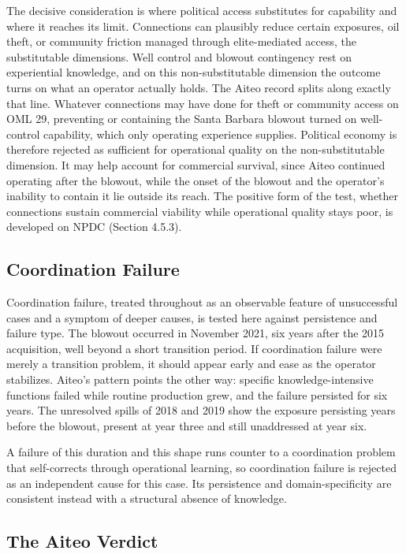 \documentclass[twoside,fontset=lmodern]{mitthesis}
\begin{document}
The decisive consideration is where political access substitutes for
capability and where it reaches its limit. Connections can plausibly
reduce certain exposures, oil theft, or community friction managed
through elite-mediated access, the substitutable dimensions. Well
control and blowout contingency rest on experiential knowledge, and on
this non-substitutable dimension the outcome turns on what an operator
actually holds. The Aiteo record splits along exactly that line.
Whatever connections may have done for theft or community access on OML
29, preventing or containing the Santa Barbara blowout turned on
well-control capability, which only operating experience supplies.
Political economy is therefore rejected as sufficient for operational
quality on the non-substitutable dimension. It may help account for
commercial survival, since Aiteo continued operating after the blowout,
while the onset of the blowout and the operator's inability to contain
it lie outside its reach. The positive form of the test, whether
connections sustain commercial viability while operational quality stays
poor, is developed on NPDC (Section 4.5.3).

\hypertarget{coordination-failure}{%
\subsection{Coordination Failure}\label{coordination-failure}}

Coordination failure, treated throughout as an observable feature of
unsuccessful cases and a symptom of deeper causes, is tested here
against persistence and failure type. The blowout occurred in November
2021, six years after the 2015 acquisition, well beyond a short
transition period. If coordination failure were merely a transition
problem, it should appear early and ease as the operator stabilizes.
Aiteo's pattern points the other way: specific knowledge-intensive
functions failed while routine production grew, and the failure
persisted for six years. The unresolved spills of 2018 and 2019 show the
exposure persisting years before the blowout, present at year three and
still unaddressed at year six.

A failure of this duration and this shape runs counter to a coordination
problem that self-corrects through operational learning, so coordination
failure is rejected as an independent cause for this case. Its
persistence and domain-specificity are consistent instead with a
structural absence of knowledge.

\hypertarget{the-aiteo-verdict}{%
\subsection{The Aiteo Verdict}\label{the-aiteo-verdict}}
\end{document}

